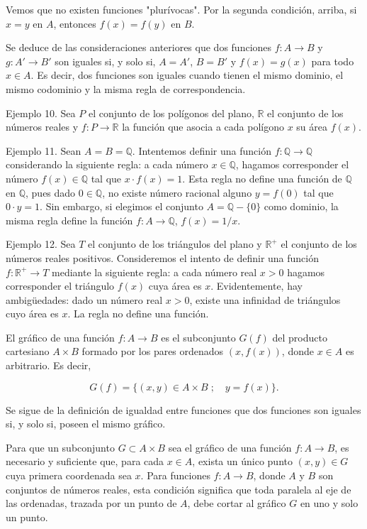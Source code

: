 Vemos que no existen funciones "plurívocas". Por la segunda condición, arriba, si \(x = y\) en \(A\), entonces \(f(x) = f(y)\) en \(B\).

Se deduce de las consideraciones anteriores que dos funciones \(f: A \to B\) y \(g: A' \to B'\) son iguales si, y solo si, \(A = A'\), \(B = B'\) y \(f(x) = g(x)\) para todo \(x \in A\). Es decir, dos funciones son iguales cuando tienen el mismo dominio, el mismo codominio y la misma regla de correspondencia.

Ejemplo 10. Sea \(P\) el conjunto de los polígonos del plano, \(\mathbb{R}\) el conjunto de los números reales y \(f: P \to \mathbb{R}\) la función que asocia a cada polígono \(x\) su área \(f(x)\).

Ejemplo 11. Sean \(A = B = \mathbb{Q}\). Intentemos definir una función \(f: \mathbb{Q} \to \mathbb{Q}\) considerando la siguiente regla: a cada número \(x \in \mathbb{Q}\), hagamos corresponder el número \(f(x) \in \mathbb{Q}\) tal que \(x \cdot f(x) = 1\). Esta regla no define una función de \(\mathbb{Q}\) en \(\mathbb{Q}\), pues dado \(0 \in \mathbb{Q}\), no existe número racional alguno \(y = f(0)\) tal que \(0 \cdot y = 1\). Sin embargo, si elegimos el conjunto \(A = \mathbb{Q} - \{0\}\) como dominio, la misma regla define la función \(f: A \to \mathbb{Q}\), \(f(x) = 1/x\).

Ejemplo 12. Sea \(T\) el conjunto de los triángulos del plano y \(\mathbb{R}^+\) el conjunto de los números reales positivos. Consideremos el intento de definir una función \(f: \mathbb{R}^+ \to T\) mediante la siguiente regla: a cada número real \(x > 0\) hagamos corresponder el triángulo \(f(x)\) cuya área es \(x\). Evidentemente, hay ambigüedades: dado un número real \(x > 0\), existe una infinidad de triángulos cuyo área es \(x\). La regla no define una función.

El gráfico de una función \(f: A \to B\) es el subconjunto \(G(f)\) del producto cartesiano \(A \times B\) formado por los pares ordenados \((x, f(x))\), donde \(x \in A\) es arbitrario. Es decir,

\[
G(f) = \{(x, y) \in A \times B \; ; \quad y = f(x)\}.
\]

Se sigue de la definición de igualdad entre funciones que dos funciones son iguales si, y solo si, poseen el mismo gráfico.

Para que un subconjunto \(G \subset A \times B\) sea el gráfico de una función \(f: A \to B\), es necesario y suficiente que, para cada \(x \in A\), exista un único punto \((x, y) \in G\) cuya primera coordenada sea \(x\). Para funciones \(f: A \to B\), donde \(A\) y \(B\) son conjuntos de números reales, esta condición significa que toda paralela al eje de las ordenadas, trazada por un punto de \(A\), debe cortar al gráfico \(G\) en uno y solo un punto.

